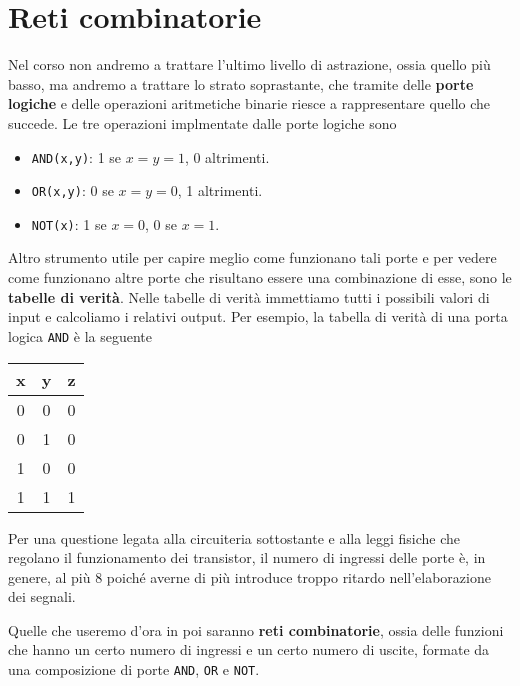 \section{Reti combinatorie}
Nel corso non andremo a trattare l'ultimo livello di astrazione, ossia quello più basso, ma andremo
a trattare lo strato soprastante, che tramite delle \textbf{porte logiche} e delle operazioni
aritmetiche binarie riesce a rappresentare quello che succede. Le tre operazioni implmentate dalle
porte logiche sono
\begin{itemize}
	\item \verb|AND(x,y)|: 1 se $x = y = 1$, 0 altrimenti.
	\item \verb|OR(x,y)|: 0 se $x = y = 0$, 1 altrimenti.
	\item \verb|NOT(x)|: 1 se $x=0$, 0 se $x=1$.
\end{itemize}
Altro strumento utile per capire meglio come funzionano tali porte e per vedere come funzionano
altre porte che risultano essere una combinazione di esse, sono le \textbf{tabelle di verità}.
Nelle tabelle di verità immettiamo tutti i possibili valori di input e calcoliamo i relativi output.
Per esempio, la tabella di verità di una porta logica \verb|AND| è la seguente
\begin{center}
	\begin{tabular}{c c | c}
		x & y & z \\ \hline
		0 & 0 & 0 \\
		0 & 1 & 0 \\
		1 & 0 & 0 \\
		1 & 1 & 1
	\end{tabular}
\end{center}
Per una questione legata alla circuiteria sottostante e alla leggi fisiche che regolano il
funzionamento dei transistor, il numero di ingressi delle porte è, in genere, al più 8 poiché
averne di più introduce troppo ritardo nell'elaborazione dei segnali.

Quelle che useremo d'ora in poi saranno \textbf{reti combinatorie}, ossia delle funzioni che hanno
un certo numero di ingressi e un certo numero di uscite, formate da una composizione di porte
\verb|AND|, \verb|OR| e \verb|NOT|.

